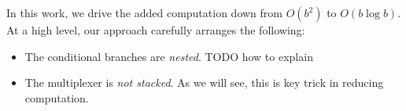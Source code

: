 In this work, we drive the added computation down from $O(b^2)$ to
$O(b \log b)$.
At a high level, our approach carefully arranges the following:
\begin{itemize}
  \item The conditional branches are \emph{nested}. TODO how to
    explain
  \item The multiplexer is \emph{not stacked}.
    As we will see, this is key trick in reducing computation.
\end{itemize}


